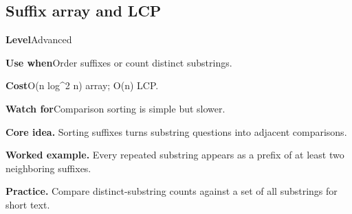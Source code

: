 \documentclass[10pt,letterpaper]{article}
\newcommand{\entrylabel}[1]{\textcolor{accent}{\bfseries #1}}
\begin{document}
\subsection{Suffix array and LCP}
\begin{guidebox}\small
\entrylabel{Level}\quad Advanced\par
\entrylabel{Use when}\quad Order suffixes or count distinct substrings.\par
\entrylabel{Cost}\quad O(n log\textasciicircum{}2 n) array; O(n) LCP.\par
\entrylabel{Watch for}\quad Comparison sorting is simple but slower.\par
\end{guidebox}
\noindent\textbf{Core idea.} Sorting suffixes turns substring questions into adjacent comparisons.\par
\noindent\textbf{Worked example.} Every repeated substring appears as a prefix of at least two neighboring suffixes.\par
\noindent\textbf{Practice.} Compare distinct-substring counts against a set of all substrings for short text.\par
\end{document}
